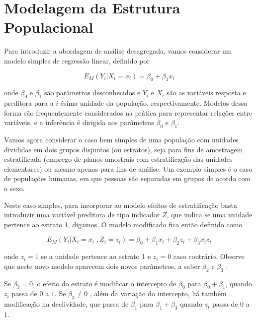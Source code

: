 \documentclass[]{book}
\numberwithin{example}{chapter}
\numberwithin{remark}{chapter}
\numberwithin{definition}{chapter}
\begin{document}
\section{Modelagem da Estrutura
Populacional}\label{modelagem-da-estrutura-populacional}

Para introduzir a abordagem de análise desagregada, vamos considerar um
modelo simples de regressão linear, definido por

\begin{equation}
E_{M}\left( Y_{i}\left| X_{i}=x_{i}\right. \right) =\beta _{0}+\beta
_{1}x_{i}  \label{eq:hier1}
\end{equation}

onde \(\beta _{0}\) e \(\beta _{1}\) são parâmetros desconhecidos e
\(Y_{i}\) e \(X_{i}\) são as variáveis resposta e preditora para a
\(i\)-ésima unidade da população, respectivamente. Modelos dessa forma
são frequentemente considerados na prática para representar relações
entre variáveis, e a inferência é dirigida aos parâmetros \(\beta _{0}\)
e \(\beta _{1}.\)

Vamos agora considerar o caso bem simples de uma população com unidades
divididas em dois grupos disjuntos (ou estratos), seja para fins de
amostragem estratificada (emprego de planos amostrais com estratificação
das unidades elementares) ou mesmo apenas para fins de análise. Um
exemplo simples é o caso de populações humanas, em que pessoas são
separadas em grupos de acordo com o sexo.

Neste caso simples, para incorporar ao modelo efeitos de estratificação
basta introduzir uma variável preditora de tipo indicador \(Z\), que
indica se uma unidade pertence ao estrato 1, digamos. O modelo
modificado fica então definido como

\begin{equation}
E_{M}\left( Y_{i}\left| X_{i}=x_{i}\;,Z_{i}=z_{i}\right. \right) =\beta
_{0}+\beta _{1}x_{i}+\beta _{2}z_{i}+\beta _{3}x_{i}z_{i}  \label{eq:hier2}
\end{equation}

onde \(z_{i}=1\) se a unidade pertence ao estrato 1 e \(z_{i}=0\) caso
contrário. Observe que neste novo modelo aparecem dois novos parâmetros,
a saber \(\beta _{2}\) e \(\beta _{3}\) .

Se \(\beta _{3}=0\), o efeito do estrato é modificar o intercepto de
\(\beta _{0}\) para \(\beta _{0}+\beta _{1}\), quando \(z_{i}\) passa de
\(0\) a \(1\). Se \(\beta _{3}\neq 0\) , além da variação do intercepto,
há também modificação na declividade, que passa de \(\beta _{1}\) para
\(\beta _{1}+\beta _{3}\) quando \(z_{i}\) passa de \(0\) a \(1\).
\end{document}
